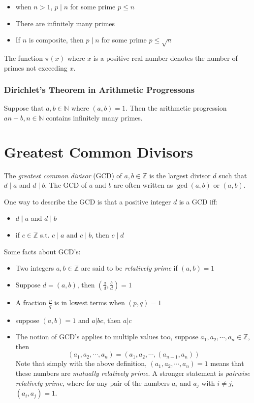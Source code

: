 \documentclass{article}
\begin{document}
\begin{multicols*}{2}
\begin{itemize}
\item when $n > 1$, $p \mid n$ for some prime $p \leq n$
\item There are infinitely many primes
\item If $n$ is composite, then $p \mid n$ for some prime $p \leq \sqrt{n}$
\end{itemize}

The function $\pi(x)$ where $x$ is a positive real number denotes the number of primes not exceeding $x$.

\subsubsection*{Dirichlet's Theorem in Arithmetic Progressons}

Suppose that $a, b \in \mathbb{N}$ where $(a, b) = 1$. Then the arithmetic progression $an+b, n \in \mathbb{N}$ contains infinitely many primes.

\section{Greatest Common Divisors}

The \textit{greatest common divisor} (GCD) of $a, b \in \mathbb{Z}$ is the largest divisor $d$ such that $d \mid a$ and $d \mid b$. The GCD of $a$ and $b$ are often written as $\gcd(a, b)$ or $(a, b)$.

One way to describe the GCD is that a positive integer $d$ is a GCD iff:

\begin{itemize}
\item $d \mid a$ and $d \mid b$
\item if $c \in \mathbb{Z}$ s.t. $c \mid a$ and $c \mid b$, then $c \mid d$
\end{itemize}

Some facts about GCD's:

\begin{itemize}
\item Two integers $a, b \in \mathbb{Z}$ are said to be \textit{relatively prime} if $(a, b) = 1$
\item Suppose $d = ( a, b )$, then $(\frac{a}{d},\frac{b}{d}) = 1$
\item A fraction $\frac{p}{q}$ is in lowest terms when $(p, q) = 1$
\item suppose $(a, b) = 1$ and $a | bc$, then $a | c$
\item The notion of GCD's applies to multiple values too, suppose $a_1,a_2, \cdots, a_n \in \mathbb{Z}$, then \[(a_1, a_2, \cdots, a_n) = (a_1, a_2, \cdots, (a_{n-1}, a_n))\]
Note that simply with the above definition, $(a_1, a_2, \cdots, a_n) = 1$ means that these numbers are \textit{mutually relatively prime}. A stronger statement is \textit{pairwise relatively prime}, where for any pair of the numbers $a_i$ and $a_j$ with $i \neq j$, $(a_i, a_j) = 1$.
\end{itemize}


\end{multicols*}
\end{document}
